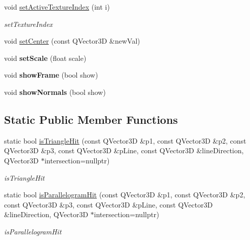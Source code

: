 \begin{DoxyCompactItemize}
\item 
void \mbox{\hyperlink{class_g_l_body_a092ff9e6d83c141c41936a7b8cd73033}{set\+Active\+Texture\+Index}} (int i)
\begin{DoxyCompactList}\small\item\em set\+Texture\+Index \end{DoxyCompactList}\item 
void \mbox{\hyperlink{class_g_l_body_abb97f9928110d5bcd47c4488e92ac78e}{set\+Center}} (const Q\+Vector3D \&new\+Val)
\item 
\mbox{\label{class_g_l_body_af601d382529e294db3fe7c993fff7a37}} 
void {\bfseries set\+Scale} (float scale)
\item 
\mbox{\label{class_g_l_body_ad7e9267bc3155d72b3623cdf5ecd9595}} 
void {\bfseries show\+Frame} (bool show)
\item 
\mbox{\label{class_g_l_body_acbf8e07de7e749a6e579ecfb683dbc56}} 
void {\bfseries show\+Normals} (bool show)
\end{DoxyCompactItemize}
\subsection*{Static Public Member Functions}
\begin{DoxyCompactItemize}
\item 
static bool \mbox{\hyperlink{class_g_l_body_aa06402c02671771961bf5dc5223fcd9d}{is\+Triangle\+Hit}} (const Q\+Vector3D \&p1, const Q\+Vector3D \&p2, const Q\+Vector3D \&p3, const Q\+Vector3D \&p\+Line, const Q\+Vector3D \&line\+Direction, Q\+Vector3D $\ast$intersection=nullptr)
\begin{DoxyCompactList}\small\item\em is\+Triangle\+Hit \end{DoxyCompactList}\item 
static bool \mbox{\hyperlink{class_g_l_body_ade0bd28b058f386bb326cbabcbf62be4}{is\+Parallelogram\+Hit}} (const Q\+Vector3D \&p1, const Q\+Vector3D \&p2, const Q\+Vector3D \&p3, const Q\+Vector3D \&p\+Line, const Q\+Vector3D \&line\+Direction, Q\+Vector3D $\ast$intersection=nullptr)
\begin{DoxyCompactList}\small\item\em is\+Parallelogram\+Hit \end{DoxyCompactList}\end{DoxyCompactItemize}
